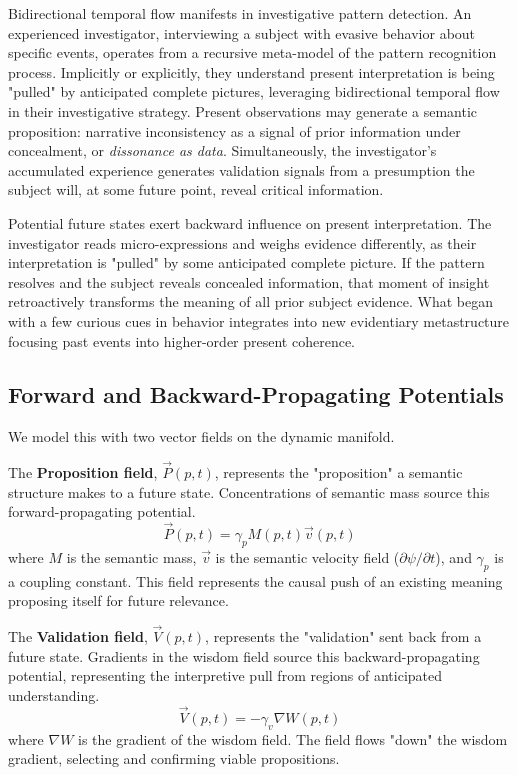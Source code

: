 Bidirectional temporal flow manifests in investigative pattern detection. An experienced investigator, interviewing a subject with evasive behavior about specific events, operates from a recursive meta-model of the pattern recognition process. Implicitly or explicitly, they understand present interpretation is being "pulled" by anticipated complete pictures, leveraging bidirectional temporal flow in their investigative strategy. Present observations may generate a semantic proposition: narrative inconsistency as a signal of prior information under concealment, or \textit{dissonance as data}. Simultaneously, the investigator's accumulated experience generates validation signals from a presumption the subject will, at some future point, reveal critical information.

Potential future states exert backward influence on present interpretation. The investigator reads micro-expressions and weighs evidence differently, as their interpretation is "pulled" by some anticipated complete picture. If the pattern resolves and the subject reveals concealed information, that moment of insight retroactively transforms the meaning of all prior subject evidence. What began with a few curious cues in behavior integrates into new evidentiary metastructure focusing past events into higher-order present coherence.


\subsection{Forward and Backward-Propagating Potentials}
We model this with two vector fields on the dynamic manifold.

The \textbf{Proposition field}, \(\vec{P}(p,t)\), represents the "proposition" a semantic structure makes to a future state. Concentrations of semantic mass source this forward-propagating potential.
\begin{equation}
\vec{P}(p,t) = \gamma_p M(p,t) \vec{v}(p,t)
\end{equation}
where \(M\) is the semantic mass, \(\vec{v}\) is the semantic velocity field (\(\partial\psi/\partial t\)), and \(\gamma_p\) is a coupling constant. This field represents the causal push of an existing meaning proposing itself for future relevance.

The \textbf{Validation field}, \(\vec{V}(p,t)\), represents the "validation" sent back from a future state. Gradients in the wisdom field source this backward-propagating potential, representing the interpretive pull from regions of anticipated understanding.
\begin{equation}
\vec{V}(p,t) = -\gamma_v \nabla W(p,t)
\end{equation}
where \(\nabla W\) is the gradient of the wisdom field. The field flows "down" the wisdom gradient, selecting and confirming viable propositions.

